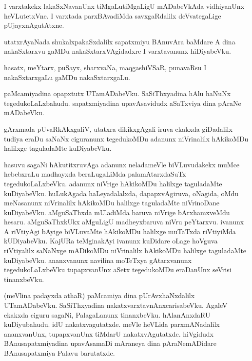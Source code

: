 \documentclass{article}
\begin{document}
\begin{mng}%
I varxtakekx lakaSxNavanUnx tiMgaLutiMgaLigU mADabeVkAda vidhiyanUnx heVLutetxVne. I varxtada 
parxBAvadiMda savxgaRdalilx deVvategaLige pUjayxnAgutAtxne.
\end{mng}

\begin{mng}%
utatxrAyaNada shukalxpakaSxdalilx sapatxmiyu BAnuvAra baMdare A dina nakaSxtarxvu gaMDu 
nakaSxtarxVAgidadxre I varxtavanunx hiDiyabeVku.
\end{mng}

\begin{mng}%
hasatx, meYtarx, puSayx, sharxvaNa, maqgashiVSaR, punavaRsu I nakaSxtarxgaLu gaMDu nakaSxtarxgaLu.
\end{mng}

\begin{mng}%
paMcamiyadina opapxtutx UTamADabeVku. SaSiThxyadina hAlu haNuNx tegedukoLaLxbahudu. sapatxmiyadina 
upavAsavidudx aSaTxviya dina pAraNe mADabeVku.
\end{mng}

\begin{mng}%
gArxmada pUvaRkAkxgaliV, utatxra dikikxgAgali iruva ekakxda giDadalilx tudiya eraDu saNaNx 
ciguranunx tegedukoMDu adanunx niVrinalilx hAkikoMDu halilxge taguladaMte kuDiyabeVku.
\end{mng}

\begin{mng}%
hasuvu sagaNi hAkutitxruvAga adanunx neladameVle biVLuvudakekx muMce hebebxraLu madhayxda 
beraLugaLiMda palamAtarxdaSuTx tegedukoLaLxbeVku. adanunx niVrige hAkikoMDu halilxge taguladaMte 
kuDiyabeVku. huLukAgada haLeyadalalxda, dapapxvAgiruva, oNagida, oMdu meNasanunx niVrinalilx 
hAkikoMDu halilxge taguladaMte niVrinoDane kuDiyabeVku. aMguSaThxda mUladiMda baruva niVrige 
bArxhamxveMdu hesaru. aMguSaThxkUkx aMguLigU madheyxbaruva niVru peYtarxvu. ivanunx A riVtiyAgi 
bAyige biVLuvaMte hAkikoMDu halilxge muTaTxda riVtiyiMda kUDiyabeVku. KajURa teMginakAyi ivanunx 
kuDidare oLage hoVguva riVtiyalilx saNaNxge mADikoMDu niVrinalilx hAkikoMDu halilxge taguladaMte 
kuDiyabeVku. ananxvanunx navilina  moTeTxya gAtarxvanunx tegedukoLaLxbeVku tupapxvanUnx aSetx 
tegedukoMDu eraDanUnx seVrisi tinanxbeVku.

(meVlina padayxda athaR) paMcamiya dina pUrAvxhaNxdalilx UTamADabeVku. SaSiThxyadina 
nakatxvarxtavnAnxcarisabeVku. AgaleV ekakxda ciguru sagaNi, PalagaLanunx tinanxbeVku. 
hAlanAnxdaRU kuDiyubahudu. idU nakatxvagutatxde. meVle heVLida parxmANadalilx ananxvanUnx, 
tupapxvanUnx tiMdarU nakatxvAgutatxde. hiVgidudx BAnusapatxmiyadina upavAsamaDi mAraneya dina 
pAraNemADidare BAnusapatxmiya Palavu barutatxde.
\end{mng}
\end{document}
